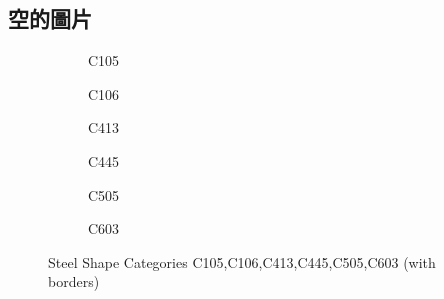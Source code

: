 \documentclass[UTF8, fontset=none]{ctexart}
\begin{document}
\subsection{空的圖片}
\begin{figure}[H]
  \centering

  \begin{subfigure}[b]{0.3\textwidth}
    \caption{C105}
    \label{fig:C105:origin}
  \end{subfigure}
  \hfill
  \begin{subfigure}[b]{0.3\textwidth}
    \caption{C106}
    \label{fig:C106:origin}
  \end{subfigure}
  \hfill
  \begin{subfigure}[b]{0.3\textwidth}
    \caption{C413}
    \label{fig:C413:origin}
  \end{subfigure}

  \vspace{0.5cm}

  \begin{subfigure}[b]{0.3\textwidth}
    \caption{C445}
    \label{fig:C445:origin}
  \end{subfigure}
  \hfill
  \begin{subfigure}[b]{0.3\textwidth}
    \caption{C505}
    \label{fig:C505:origin}
  \end{subfigure}
  \hfill
  \begin{subfigure}[b]{0.3\textwidth}
    \caption{C603}
    \label{fig:C603:origin}
  \end{subfigure}

  \caption{Steel Shape Categories C105,C106,C413,C445,C505,C603 (with borders)}
  \label{fig:CXXX:origin}
\end{figure}
\end{document}

